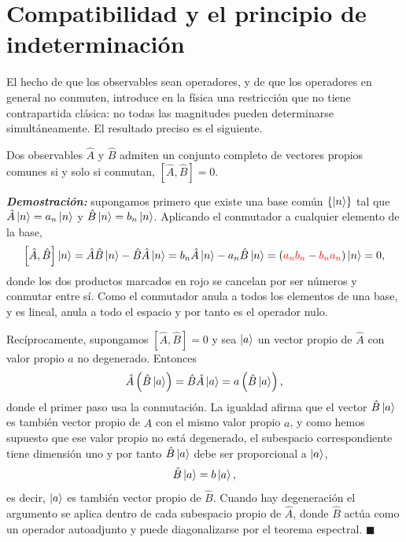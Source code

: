 \section{Compatibilidad y el principio de indeterminación}

        El hecho de que los observables sean operadores, y de que los operadores en general no conmuten, introduce en la física una restricción que no tiene contrapartida clásica: no todas las magnitudes pueden determinarse simultáneamente. El resultado preciso es el siguiente.

        \begin{myteo}\label{teo:Compatibles}
            Dos observables $\hat{A}$ y $\hat{B}$ admiten un conjunto completo de vectores propios comunes si y solo si conmutan, $[\hat{A},\hat{B}] = 0$.
        \end{myteo}

        \textbf{\textit{Demostración:}} supongamos primero que existe una base común $\{\ket{n}\}$ tal que $\hat{A}\ket{n} = a_{n}\ket{n}$ y $\hat{B}\ket{n} = b_{n}\ket{n}$. Aplicando el conmutador a cualquier elemento de la base,
        \begin{equation}\label{eq:ConmutadorBase}
            \left[\hat{A},\hat{B}\right]\ket{n} = \hat{A}\hat{B}\ket{n} - \hat{B}\hat{A}\ket{n} = b_{n}\hat{A}\ket{n} - a_{n}\hat{B}\ket{n} = \left(\textcolor{red}{a_{n}b_{n}} - \textcolor{red}{b_{n}a_{n}}\right)\ket{n} = 0,
        \end{equation}
        donde los dos productos marcados en rojo se cancelan por ser números y conmutar entre sí. Como el conmutador anula a todos los elementos de una base, y es lineal, anula a todo el espacio y por tanto es el operador nulo.

        Recíprocamente, supongamos $[\hat{A},\hat{B}] = 0$ y sea $\ket{a}$ un vector propio de $\hat{A}$ con valor propio $a$ no degenerado. Entonces
        \begin{equation}\label{eq:ReciprocoConmutan}
            \hat{A}\left(\hat{B}\ket{a}\right) = \hat{B}\hat{A}\ket{a} = a\left(\hat{B}\ket{a}\right),
        \end{equation}
        donde el primer paso usa la conmutación. La igualdad afirma que el vector $\hat{B}\ket{a}$ es también vector propio de $\hat{A}$ con el mismo valor propio $a$, y como hemos supuesto que ese valor propio no está degenerado, el subespacio correspondiente tiene dimensión uno y por tanto $\hat{B}\ket{a}$ debe ser proporcional a $\ket{a}$,
        \begin{equation}\label{eq:BEsPropio}
            \hat{B}\ket{a} = b\ket{a},
        \end{equation}
        es decir, $\ket{a}$ es también vector propio de $\hat{B}$. Cuando hay degeneración el argumento se aplica dentro de cada subespacio propio de $\hat{A}$, donde $\hat{B}$ actúa como un operador autoadjunto y puede diagonalizarse por el teorema espectral. $\blacksquare$

